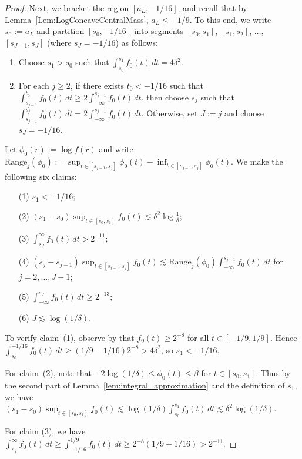 \documentclass[a4paper,12pt]{article}
\begin{document}
\begin{proof}
Next, we bracket the region $[a_L, -1/16]$, and recall that by Lemma~\ref{Lem:LogConcaveCentralMass}, $a_L \leq -1/9$.  To this end, we write $s_0 := a_L$ and partition $[s_0,-1/16]$ into segments $[s_0, s_1]$, $[s_1, s_2]$, $\ldots$, $[s_{J-1},s_J]$ (where $s_J = -1/16$) as follows:
  \begin{enumerate}
  \item Choose $s_1 > s_0$ such that $\int_{s_0}^{s_1} f_0(t) \, dt = 4 \delta^2$.
  \item For each $j \geq 2$, if there exists $t_0 < -1/16$ such that $\int_{s_{j-1}}^{t_0} f_0(t) \, dt \geq 2\int_{-\infty}^{s_{j-1}} f_0(t) \, dt$, then choose $s_j$ such that $\int_{s_{j-1}}^{s_j} f_0(t) \, dt = 2\int_{-\infty}^{s_{j-1}} f_0(t) \, dt$. Otherwise, set $J := j$ and choose $s_J = -1/16$.
  \end{enumerate}
Let $\phi_0(r) := \log f(r)$ and write $\mathrm{Range}_j(\phi_0) := \sup_{t \in [s_{j-1},s_j]} \phi_0(t) - \inf_{t \in [s_{j-1},s_j]} \phi_0(t)$.  We make the following six claims:
  \begin{enumerate}
  \item[(1)] $s_1 < -1/16$;
  \item[(2)] $(s_1 - s_0)\sup_{t \in [s_0, s_1]} f_0(t) \lesssim \delta^2 \log \frac{1}{\delta}$;
  \item[(3)] $\int_{s_J}^{\infty} f_0(t) \, dt > 2^{-11}$;
  \item[(4)] $(s_j - s_{j-1})\sup_{t \in [s_{j-1}, s_j]} f_0(t) \lesssim \mathrm{Range}_j(\phi_0) \int_{-\infty}^{s_{j-1}} f_0(t) \, dt$ for $j=2,\ldots,J-1$;
  \item[(5)] $\int_{-\infty}^{s_J} f_0(t) \, dt \geq 2^{-13}$;
  \item[(6)] $J \lesssim \log(1/\delta)$.
  \end{enumerate}
To verify claim~(1), observe by \citet[][Theorem~5.14(a)]{lovasz2007geometry} that $f_0(t) \geq 2^{-8}$ for all $t \in [-1/9, 1/9]$.  Hence $\int_{s_0}^{-1/16} f_0(t)\, dt \geq (1/9 - 1/16) 2^{-8} > 4\delta^2$, so $s_1 < -1/16$.

For claim~(2), note that $-2 \log (1/\delta) \leq \phi_0(t) \leq \beta$ for $t \in  [s_0, s_1]$.  Thus
  by the second part of Lemma~\ref{lem:integral_approximation} and the definition of $s_1$, we have $(s_1 - s_0) \sup_{t \in [s_0, s_1]} f_0(t) \lesssim \log (1/\delta) \int_{s_0}^{s_1} f_0(t) \, dt \lesssim \delta^2 \log (1/\delta)$.
  
  For claim (3), we have $\int_{s_j}^{\infty} f_0(t) \, dt \geq \int_{-1/16}^{1/9} f_0(t) \, dt \geq 2^{-8} (1/9 + 1/16) > 2^{-11}$.


\end{proof}
\end{document}
